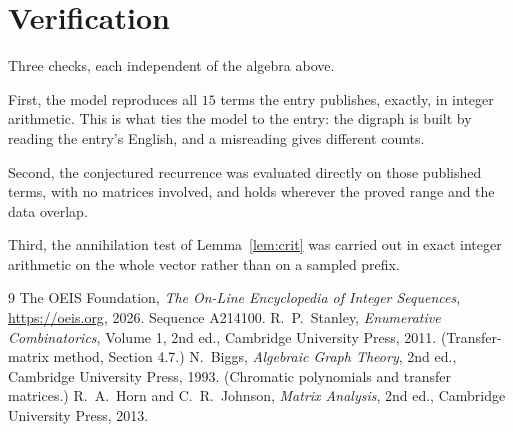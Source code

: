 \documentclass[11pt,a4paper]{article}
\theoremstyle{plain}
\theoremstyle{definition}
\begin{document}
\section{Verification}

Three checks, each independent of the algebra above.

First, the model reproduces all $15$ terms the entry publishes, exactly, in integer
arithmetic. This is what ties the model to the entry: the digraph is built by reading the
entry's English, and a misreading gives different counts.

Second, the conjectured recurrence was evaluated directly on those published terms, with no
matrices involved, and holds wherever the proved range and the data overlap.

Third, the annihilation test of Lemma~\ref{lem:crit} was carried out in exact integer
arithmetic on the whole vector rather than on a sampled prefix.

\begin{thebibliography}{9}
 The OEIS Foundation, \emph{The On-Line Encyclopedia of Integer
Sequences}, \url{https://oeis.org}, 2026. Sequence A214100.
 R.~P.~Stanley, \emph{Enumerative Combinatorics}, Volume 1, 2nd ed.,
Cambridge University Press, 2011. (Transfer-matrix method, Section 4.7.)
 N.~Biggs, \emph{Algebraic Graph Theory}, 2nd ed., Cambridge University
Press, 1993. (Chromatic polynomials and transfer matrices.)
 R.~A.~Horn and C.~R.~Johnson, \emph{Matrix Analysis}, 2nd ed., Cambridge
University Press, 2013.
\end{thebibliography}
\end{document}
